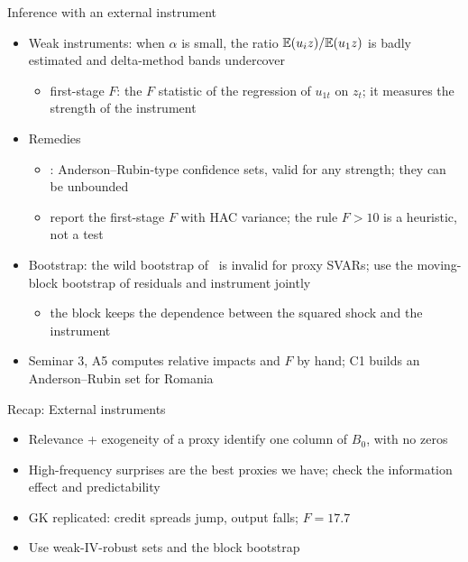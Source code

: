 \begin{frame}{Inference with an external instrument}
\itemsize{\small}
\begin{itemize}
    \item Weak instruments: when $\alpha$ is small, the ratio $\mathbb{E}(u_iz)/\mathbb{E}(u_1z)$ is badly estimated and delta-method bands undercover
    \begin{itemize}
        \item first-stage $F$: the $F$ statistic of the regression of $u_{1t}$ on $z_t$; it measures the strength of the instrument
    \end{itemize}
    \item Remedies
    \begin{itemize}
        \item {}: Anderson--Rubin-type confidence sets, valid for any strength; they can be unbounded
        \item report the first-stage $F$ with HAC variance; the rule $F > 10$ is a heuristic, not a test
    \end{itemize}
    \item Bootstrap: the wild bootstrap of \ is invalid for proxy SVARs; use the moving-block bootstrap of residuals and instrument jointly 
    \begin{itemize}
        \item the block keeps the dependence between the squared shock and the instrument
    \end{itemize}
    \item Seminar 3, A5 computes relative impacts and $F$ by hand; C1 builds an Anderson--Rubin set for Romania
\end{itemize}
\end{frame}

\begin{frame}{Recap: External instruments}
\itemsize{\small}
\begin{itemize}
    \item Relevance + exogeneity of a proxy identify one column of $B_0$, with no zeros
    \item High-frequency surprises are the best proxies we have; check the information effect and predictability
    \item GK replicated: credit spreads jump, output falls; $F = 17.7$
    \item Use weak-IV-robust sets and the block bootstrap
\end{itemize}
\end{frame}


